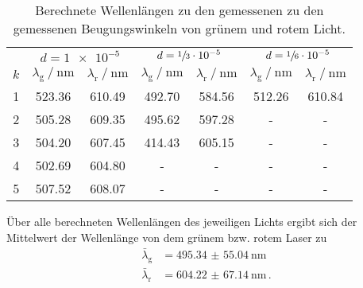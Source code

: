 \begin{table}
    \centering
    \caption{Berechnete Wellenlängen zu den gemessenen zu den gemessenen Beugungswinkeln von grünem und rotem Licht.}
    \label{tab:diffractionwavelength}
    \begin{tabular} {S[table-format=1.0] 
                     S[table-format=3.2]  S[table-format=3.2]
                     S[table-format=3.2]  S[table-format=3.2] 
                     S[table-format=3.2]  S[table-format=3.2]}
        \toprule
        & 
         & 
         & 
        \\
        \cmidrule(lr){2-3}\cmidrule(lr){4-5}\cmidrule(lr){6-7}
        {$k$} 
        & {$\lambda_\text{g} \mathbin{/} \si{\nano\metre}$} & {$\lambda_\text{r} \mathbin{/} \si{\nano\metre}$}
        & {$\lambda_\text{g} \mathbin{/} \si{\nano\metre}$} & {$\lambda_\text{r} \mathbin{/} \si{\nano\metre}$}
        & {$\lambda_\text{g} \mathbin{/} \si{\nano\metre}$} & {$\lambda_\text{r} \mathbin{/} \si{\nano\metre}$} \\
     & 523.36 & 610.49 & 492.70 & 584.56 & 512.26 & 610.84\\
    2 & 505.28 & 609.35 & 495.62 & 597.28 & {-}    & {-}   \\
    3 & 504.20 & 607.45 & 414.43 & 605.15 & {-}    & {-}   \\
    4 & 502.69 & 604.80 & {-}    & {-}    & {-}    & {-}   \\
    5 & 507.52 & 608.07 & {-}    & {-}    & {-}    & {-}   \\
    \bottomrule
\end{tabular}
\end{table}
Über alle berechneten Wellenlängen des jeweiligen Lichts ergibt sich der Mittelwert der Wellenlänge von dem grünem bzw. rotem Laser zu
\begin{align*}
    \bar{\lambda}_\text{g} & = \SI{495.34(5504)}{\nano\metre} \\
    \bar{\lambda}_\text{r} & = \SI{604.22(6714)}{\nano\metre} \, \text{.}
\end{align*}
